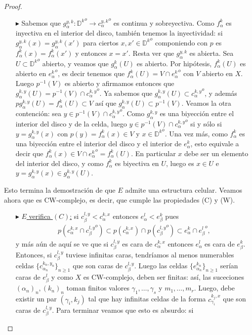 \documentclass[11pt]{article}
\newcommand{\D}{\mathbb{D}}
\newcommand{\tint}[1]{#1^o}%
\begin{document}
\begin{proof}
\begin{itemize}
\begin{itemize}
\item[$\blacktriangleright$] Sabemos que $g_\alpha^{y,k} : \tint{{\D^k}} \to \tint{{c_\alpha^{y,k}}}$ es continua y sobreyectiva. Como $f_\alpha^k$ es inyectiva en el interior del disco, tambi\'en tenemos la inyectividad: si $g_\alpha^{y,k}(x) = g_\alpha^{y,k}(x')$ para ciertos $x,x' \in \tint{{\D^k}}$ componiendo con $p$ es $f_\alpha^k(x) = f_\alpha^k(x')$ y entonces $x = x'$. Resta ver que $g_\alpha^{y,k}$ es abierta. Sea $U \subset \tint{{\D^k}}$ abierto, y veamos que $g_\alpha^k(U)$ es abierto. Por hip\'otesis, $f_\alpha^k(U)$ es abierto en $\tint{{e_\alpha^k}}$, es decir tenemos que $f_\alpha^k(U) = V \cap \tint{{e_\alpha^k}}$ con $V$ abierto en $X$. Luego $p^{-1}(V)$ es abierto y afirmamos entonces que $g_\alpha^{k,y}(U) = p^{-1}(V) \cap \tint{{c_\alpha^{k,y}}}$. Ya sabemos que $g_\alpha^{k,y}(U) \subset \tint{{c_\alpha^{k,y}}}$, y adem\'as $pg_\alpha^{k,y}(U) = f_\alpha^k(U) \subset V$ as\'i que $g_\alpha^{k,y}(U) \subset p^{-1}(V)$. Veamos la otra contenci\'on: sea $y \in p^{-1}(V) \cap \tint{{c_\alpha^{k,y}}}$. Como $g_\alpha^{k,y}$ es una biyecci\'on entre el interior del disco y de la celda, luego $y \in p^{-1}(V) \cap \tint{{c_\alpha^{k,y}}}$ si y s\'olo si $y = g_\alpha^{k,y}(x)$ con $p(y) = f_\alpha^k(x) \in V$ y $x \in \tint{{\D^k}}$. Una vez m\'as, como $f_\alpha^k$ es una biyecci\'on entre el interior del disco y el interior de $e_\alpha^k$, esto equivale a decir que $f_\alpha^k(x) \in V \cap \tint{{e_\alpha^k}} = f_\alpha^k(U)$. En particular $x$ debe ser un elemento del interior del disco, y como $f_\alpha^k$ es biyectiva en $U$, luego es $x \in U$ e $y = g_\alpha^{k,y}(x) \in g_\alpha^{k,y}(U)$. 
\end{itemize}
\end{itemize}
Esto termina la demostraci\'on de que $E$ admite una estructura celular. Veamos ahora que es CW-complejo, es decir, que cumple las propiedades (C) y (W).
\begin{itemize}
\item[$\blacktriangleright$] \underline{$E$ verifica $(C)$:} si $c_\beta^{l,y} < c_\alpha^{k,x}$ entonces $e_\alpha^l < e_\beta^k$ pues
\begin{align*}
p({c_\alpha^{k,x}} \cap \tint{{c_\beta^{l,y}}}) \subset p(c_\alpha^{k,x}) \cap p(\tint{{c_\beta^{l,y}}}) \subset e_\alpha^k \cap \tint{{e_\beta^l}},
\end{align*}
y m\'as a\'un de aqu\'i se ve que si $c_\beta^{l,y}$ es cara de $c_\alpha^{k,x}$ entonces $e_\alpha^l$ es cara de  $e_\beta^k$. Entonces, si $c_\beta^{l,y}$ tuviese infinitas caras, tendr\'iamos al menos numerables celdas $\{c_{\alpha_n}^{k_n,y_n}\}_{n \geq 1}$ que son caras de $c_\beta^{l,y}$. Luego las celdas $\{e_{\alpha_n}^{k_n}\}_{n \geq 1}$ ser\'ian caras de $e_\beta^l$ y como $X$ es CW-complejo, deben ser finitas: as\'i, las suceciones $(\alpha_n)_n,(k_n)_n$ toman finitos valores $\gamma_1, \dots, \gamma_s$ y $m_1, \dots, m_r$. Luego, debe existir un par $(\gamma_i,k_j)$ tal que hay infinitas celdas de la forma $c_{\gamma_i}^{k_j,x}$ que son caras de $c_\beta^{l,y}$. Para terminar veamos que esto es absurdo: si 

\end{itemize}
\end{proof}
\end{document}
